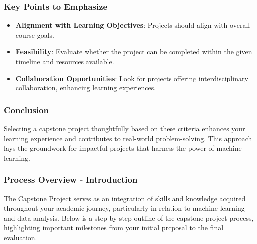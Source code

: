 \documentclass[aspectratio=169]{beamer}
\begin{document}
\begin{frame}[fragile]
  \frametitle{Key Points to Emphasize}
  \begin{itemize}
    \item \textbf{Alignment with Learning Objectives}: Projects should align with overall course goals.
    \item \textbf{Feasibility}: Evaluate whether the project can be completed within the given timeline and resources available.
    \item \textbf{Collaboration Opportunities}: Look for projects offering interdisciplinary collaboration, enhancing learning experiences.
  \end{itemize}
\end{frame}

\begin{frame}[fragile]
  \frametitle{Conclusion}
  Selecting a capstone project thoughtfully based on these criteria enhances your learning experience and contributes to real-world problem-solving. 
  This approach lays the groundwork for impactful projects that harness the power of machine learning.
\end{frame}

\begin{frame}[fragile]
  \frametitle{Process Overview - Introduction}
  The Capstone Project serves as an integration of skills and knowledge acquired throughout your academic journey, particularly in relation to machine learning and data analysis. Below is a step-by-step outline of the capstone project process, highlighting important milestones from your initial proposal to the final evaluation.
\end{frame}
\end{document}

